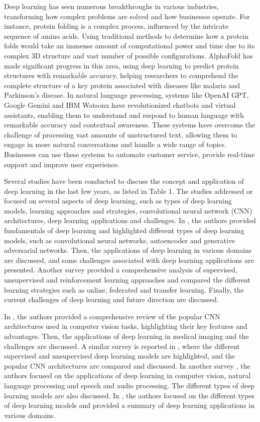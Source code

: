 \documentclass[preprint,12pt]{elsarticle}
\begin{document}
Deep learning has seen numerous breakthroughs in various industries, transforming how complex problems are solved and how businesses operate. For instance, protein folding is a complex process, influenced by the intricate sequence of amino acids. Using traditional methods to determine how a protein folds would take an immense amount of computational power and time due to its complex 3D structure and vast number of possible configurations. AlphaFold has made significant progress in this area, using deep learning to predict protein structures with remarkable accuracy, helping researchers to comprehend the complete structure of a key protein associated with diseases like malaria and Parkinson's disease. In natural language processing, systems like OpenAI GPT, Google Gemini and IBM Watsonx have revolutionized chatbots and virtual assistants, enabling them to understand and respond to human language with remarkable accuracy and contextual awareness. These systems have overcome the challenge of processing vast amounts of unstructured text, allowing them to engage in more natural conversations and handle a wide range of topics. Businesses can use these systems to automate customer service, provide real-time support and improve user experience.

Several studies have been conducted to discuss the concept and application of deep learning in the last few years, as listed in Table 1. The studies addressed or focused on several aspects of deep learning, such as types of deep learning models, learning approaches and strategies, convolutional neural network (CNN) architectures, deep learning applications and challenges. In \cite{dong_survey_2021}, the authors provided fundamentals of deep learning and highlighted different types of deep learning models, such as convolutional neural networks, autoencoder and generative adversarial networks. Then, the applications of deep learning in various domains are discussed, and some challenges associated with deep learning applications are presented. Another survey \cite{talaei_khoei_deep_2023} provided a comprehensive analysis of supervised, unsupervised and reinforcement learning approaches and compared the different learning strategies such as online, federated and transfer learning. Finally, the current challenges of deep learning and future direction are discussed.

In \citep{alzubaidi_review_2021}, the authors provided a comprehensive review of the popular CNN architectures used in computer vision tasks, highlighting their key features and advantages. Then, the applications of deep learning in medical imaging and the challenges are discussed. A similar survey is reported in \citep{alom_state_art_2019}, where the different supervised and unsupervised deep learning models are highlighted, and the popular CNN architectures are compared and discussed. In another survey \citep{pouyanfar_survey_2018}, the authors focused on the applications of deep learning in computer vision, natural language processing and speech and audio processing. The different types of deep learning models are also discussed. In \citep{sarker_deep_2021}, the authors focused on the different types of deep learning models and provided a summary of deep learning applications in various domains.
\end{document}
